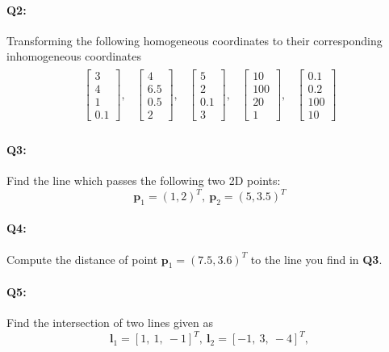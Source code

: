 \documentclass[a4paper]{article}
\begin{document}
\paragraph{Q2:} Transforming the following homogeneous coordinates to their corresponding inhomogeneous coordinates
\begin{align}
\begin{matrix}
\left[ \begin{matrix} 3 \\ 4 \\ 1 \\ 0.1 \end{matrix}\right], & 
\left[ \begin{matrix} 4 \\ 6.5 \\ 0.5 \\ 2 \end{matrix}\right], &
\left[ \begin{matrix} 5 \\ 2 \\ 0.1 \\ 3 \end{matrix}\right], &
\left[ \begin{matrix} 10 \\ 100 \\ 20 \\ 1  \end{matrix}\right], &
\left[ \begin{matrix} 0.1 \\ 0.2 \\ 100 \\ 10 \end{matrix}\right]
\end{matrix} \nonumber
\end{align} 

\paragraph{Q3:} 
Find the line which passes the following two 2D points: $$\mathbf{p}_1=(1,2)^{T},\ \mathbf{p}_2=(5,3.5)^{T}$$

\paragraph{Q4:} Compute the distance of point $\mathbf{p}_1=(7.5,3.6)^{T}$ to the line you find in \textbf{Q3}.

\paragraph{Q5:} Find the intersection of two lines given as
$$
\mathbf{l}_1 = [1,\ 1,\ -1]^{T},\ \mathbf{l}_2 = [-1,\ 3,\ -4]^{T},
$$
\end{document}
